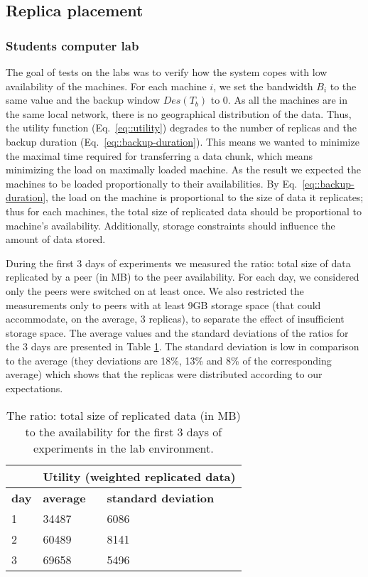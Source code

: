 \documentclass[10pt, final, conference, letterpaper]{IEEEtran}
\begin{document}
\subsection{Replica placement}

\subsubsection{Students computer lab}
The goal of tests on the labs was to verify how the system copes with low availability of the machines. 
For each machine $i$, we set the bandwidth $B_i$ to the same value and the backup window $Des(T_b)$ to 0. As all the machines are in the same local network, there is no geographical distribution of the data. Thus, the utility function (Eq.~\ref{eq::utility}) degrades to the number of replicas and the backup duration (Eq.~\ref{eq::backup-duration}).
This means we wanted to minimize the maximal time required for transferring a data chunk, which means minimizing the load on maximally loaded machine. As the result we expected the machines to be loaded proportionally to their availabilities. By Eq.~\ref{eq::backup-duration}, the load on the machine is proportional to the size of data it replicates; thus for each machines, the total size of replicated data should be proportional to machine's availability. Additionally, storage constraints should influence the amount of data stored.


During the first 3 days of experiments we measured the ratio: total size of data replicated by a peer (in MB) to the peer availability. For each day, we considered only the peers were switched on at least once. We also restricted the measurements only to peers with at least 9GB storage space (that could accommodate, on the average, 3 replicas), to separate the effect of insufficient storage space.
The average values and the standard deviations of the ratios for the 3 days are presented in Table \ref{tab::replicaPlacement}. The standard deviation is low in comparison to the average (they deviations are 18\%, 13\% and 8\% of the corresponding average) which shows that the replicas were distributed according to our expectations.

\begin{table}[tb]
    \centering
    \caption{The ratio: total size of replicated data (in MB) to the availability for the first 3 days of experiments in the lab environment.}
    \label{tab::replicaPlacement}
    \begin{tabular}{ | l | l | l |}
    \hline
    & \multicolumn{2}{c|}{\textbf{Utility (weighted replicated data)}} \\ \hline
    \textbf{day} & \textbf{average} & \textbf{standard deviation} \\ \hline \hline
    1 & 34487 &  6086 \\ \hline
    2 & 60489 &  8141 \\ \hline
    3 & 69658 &  5496 \\ \hline
    \end{tabular}
\end{table}
\end{document}
